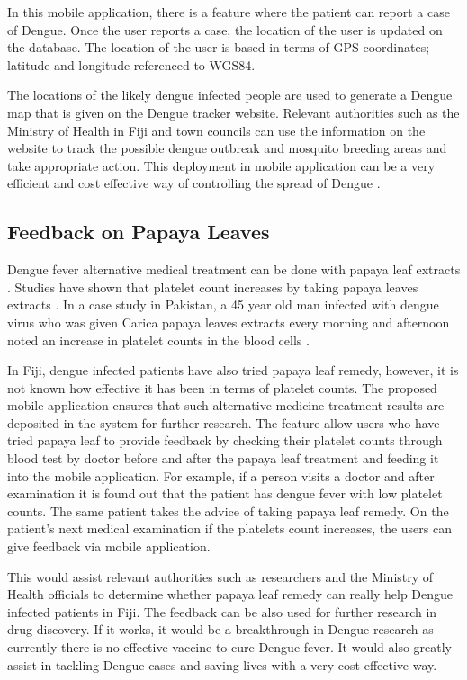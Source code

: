 \documentclass[runningheads,a4paper]{llncs}
\begin{document}
In this mobile application, there is a feature where the patient can report a case of Dengue. Once the user reports a case, the location of the user is updated on the database. The location of the user is  based   in terms of GPS coordinates; latitude and longitude referenced to WGS84.


The locations of the likely dengue infected people are used to generate a Dengue map that is given on the Dengue tracker website. Relevant authorities such as the Ministry of Health in Fiji and town councils can use the information on the website to track the possible dengue outbreak and mosquito breeding areas and take appropriate action. This deployment in mobile application can be a very efficient and cost effective way of controlling the spread of Dengue \cite{Chang2009}.


\subsection{Feedback on Papaya Leaves}

Dengue fever alternative medical treatment can be done with papaya leaf extracts \cite{Sarala2014}. Studies have shown that platelet count increases by taking papaya leaves extracts \cite{Subenthiran2013} \cite{Senthilvel2013}. In a case study in Pakistan, a 45 year old man infected with dengue virus who was given Carica papaya leaves extracts every morning and afternoon noted an increase in platelet counts in the blood cells \cite{Ahmad2011330}.

In Fiji, dengue infected patients have also tried papaya leaf remedy, however, it is not known how effective it has been in terms of platelet counts. The proposed mobile application ensures that such alternative medicine treatment results are deposited in the system for further research. The  feature allow users who have tried papaya leaf to provide feedback by checking their platelet counts through blood test by doctor  before and after the papaya leaf treatment and feeding it into the mobile application. For example, if a person visits a doctor and after examination it is found out that the patient has dengue fever with low platelet counts. The same patient takes the advice of taking papaya leaf remedy. On the patient’s next medical examination if the platelets count increases, the users can give feedback via mobile application. 


This would assist relevant authorities such as researchers and the Ministry of Health officials  to determine whether papaya leaf remedy can really help  Dengue infected patients in Fiji.  The feedback can be also used for further research in drug discovery.  If it works, it would be a breakthrough in Dengue research as currently there is no effective vaccine to cure Dengue fever. It would also greatly assist in tackling Dengue cases and saving lives with a very cost effective way.
\end{document}
